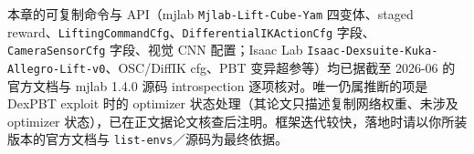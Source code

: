 \begin{finenote}
本章的可复制命令与 API（mjlab \verb|Mjlab-Lift-Cube-Yam| 四变体、staged reward、\verb|LiftingCommandCfg|、\verb|DifferentialIKActionCfg| 字段、\verb|CameraSensorCfg| 字段、视觉 CNN 配置；Isaac Lab \verb|Isaac-Dexsuite-Kuka-Allegro-Lift-v0|、OSC/DiffIK cfg、PBT 变异超参等）均已据截至 2026-06 的官方文档与 mjlab 1.4.0 源码 introspection 逐项核对。唯一仍属推断的项是 DexPBT exploit 时的 optimizer 状态处理（其论文只描述复制网络权重、未涉及 optimizer 状态），已在正文据论文核查后注明。框架迭代较快，落地时请以你所装版本的官方文档与 \verb|list-envs|／源码为最终依据。
\end{finenote}
